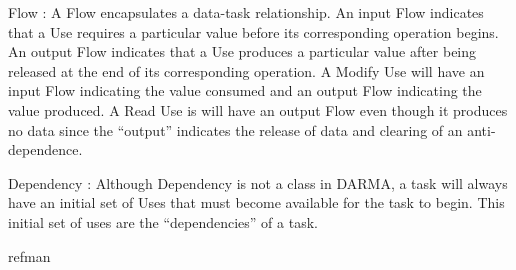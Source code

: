 \begin{compactdesc}
\item [Flow]: A Flow encapsulates a data-task relationship. 
An input Flow indicates that a Use requires a particular value before its corresponding operation begins.
An output Flow indicates that a Use produces a particular value after being released at the end of its corresponding operation.
A Modify Use will have an input Flow indicating the value consumed and an output Flow indicating the value produced.
A Read Use is will have an output Flow even though it produces no data since the ``output'' indicates the release of data and clearing of an anti-dependence.
\item [Dependency]: Although Dependency is not a class in DARMA, a task will always have an initial set of Uses that must become
available for the task to begin.
This initial set of uses are the ``dependencies'' of a task.
\end{compactdesc} 

{refman}
